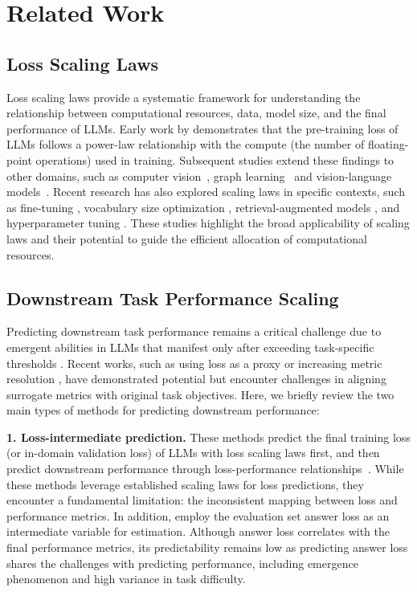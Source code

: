 \section{Related Work}
\label{sec:relatedwork}

\subsection{Loss Scaling Laws}
Loss scaling laws provide a systematic framework for understanding the relationship between computational resources, data, model size, and the final performance of LLMs. Early work by \citet{kaplan2020scaling} demonstrates that the pre-training loss of LLMs follows a power-law relationship with the compute (the number of floating-point operations) used in training. Subsequent studies extend these findings to other domains, such as computer vision~\citep{zhai2022scaling}, graph learning~\citep{ma2024scaling} and vision-language models~\citep{alabdulmohsin2022scaling, henighan2020scaling}. Recent research has also explored scaling laws in specific contexts, such as fine-tuning \citep{hernandez2021scaling, tay2021scale}, vocabulary size optimization \citep{tao2024scaling}, retrieval-augmented models \citep{shao2024scaling}, and hyperparameter tuning \citep{lingle2024hyperparameters, yang2022hyperparameters}. These studies highlight the broad applicability of scaling laws and their potential to guide the efficient allocation of computational resources.


\subsection{Downstream Task Performance Scaling}

Predicting downstream task performance remains a critical challenge due to emergent abilities in LLMs that manifest only after exceeding task-specific thresholds \citep{wei2022emergent,schaeffer2024emergent}. 
Recent works, such as using loss as a proxy \citep{chen2024scaling} or increasing metric resolution \citep{hu2023predicting}, have demonstrated potential but encounter challenges in aligning surrogate metrics with original task objectives. Here, we briefly review the two main types of methods for predicting downstream performance:

\noindent\textbf{1. Loss-intermediate prediction.}
These methods predict the final training loss (or in-domain validation loss) of LLMs with loss scaling laws first, and then predict downstream performance through loss-performance relationships~\citep{chen2024scaling, gadre2024language, du2024understanding}. While these methods leverage established scaling laws for loss predictions, they encounter a fundamental limitation: the inconsistent mapping between loss and performance metrics. In addition, \citet{xiao2024densing} employ the evaluation set answer loss as an intermediate variable for estimation. Although answer loss correlates with the final performance metrics, its predictability remains low as predicting answer loss shares the challenges with predicting performance, including emergence phenomenon and high variance in task difficulty.


